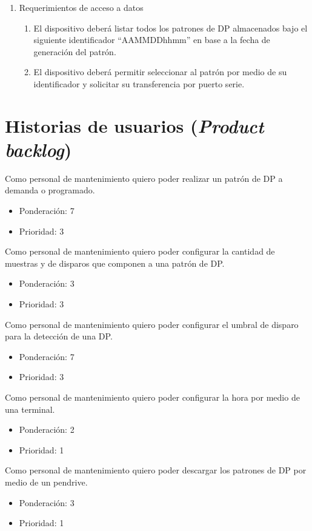 \documentclass[11pt]{charter}
\begin{document}
\begin{enumerate}
\begin{enumerate}
	\end{enumerate}
\item Requerimientos de acceso a datos
	\begin{enumerate}
	\item El dispositivo deberá listar todos los patrones de DP almacenados bajo el siguiente identificador “AAMMDDhhmm” en base a la fecha de generación del patrón. 
	\item El dispositivo deberá permitir seleccionar al patrón por medio de su identificador y solicitar su transferencia por puerto serie.
	\end{enumerate}

\end{enumerate}

\section{Historias de usuarios (\textit{Product backlog})}
\label{sec:backlog}
Como personal de mantenimiento quiero poder realizar un patrón de DP a demanda o programado.
\begin{itemize}
\item Ponderación: 7
\item Prioridad: 3
\end{itemize}

Como personal de mantenimiento quiero poder configurar la cantidad de muestras y de disparos que componen a una patrón de DP.
\begin{itemize}
\item Ponderación: 3
\item Prioridad: 3
\end{itemize}

Como personal de mantenimiento quiero poder configurar el umbral de disparo para la detección de una DP.
\begin{itemize}
\item Ponderación: 7
\item Prioridad: 3
\end{itemize}

Como personal de mantenimiento quiero poder configurar la hora por medio de una terminal.
\begin{itemize}
\item Ponderación: 2
\item Prioridad: 1
\end{itemize}

Como personal de mantenimiento quiero poder descargar los patrones de DP por medio de un pendrive.
\begin{itemize}
\item Ponderación: 3
\item Prioridad: 1
\end{itemize}
\end{document}
